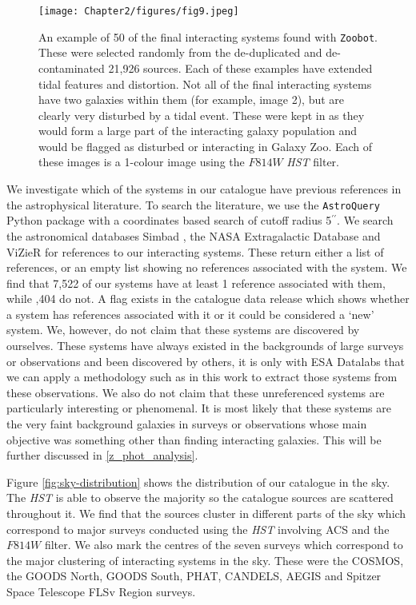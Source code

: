 {\begin{figure}
  \centering
  \texttt{[image: Chapter2/figures/fig9.jpeg]}
  \caption[An example of 50 of the final interacting systems found with \texttt{Zoobot}.]{An example of 50 of the final interacting systems found with \texttt{Zoobot}. These were selected randomly from the de-duplicated and de-contaminated 21,926 sources. Each of these examples have extended tidal features and distortion. Not all of the final interacting systems have two galaxies within them (for example, image 2), but are clearly very disturbed by a tidal event. These were kept in as they would form a large part of the interacting galaxy population and would be flagged as disturbed or interacting in Galaxy Zoo. Each of these images is a 1-colour image using the $F814W$ \emph{HST} filter.}
  \label{fig:interactors}
\end{figure}

We investigate which of the systems in our catalogue have previous references in the astrophysical literature. To search the literature, we use the \texttt{AstroQuery} Python package with a coordinates based search of cutoff radius 5$^{\prime\prime}$. We search the astronomical databases Simbad \citep{simbad}, the NASA Extragalactic Database \citep[NED;][]{1991ASSL..171...89H} and ViZieR \citep{2000A&AS..143...23O} for references to our interacting systems. These return either a list of references, or an empty list showing no references associated with the system. We find that 7,522 of our systems have at least 1 reference associated with them, while \DIFdelbegin {},404 do not. A flag exists in the catalogue data release which shows whether a system has references associated with it or it could be considered a `new' system. We, however, do not claim that these systems are discovered by ourselves. These systems have always existed in the backgrounds of large surveys or observations and been discovered by others, it is only with ESA Datalabs that we can apply a methodology such as in this work to extract those systems from these observations. We also do not claim that these unreferenced systems are particularly interesting or phenomenal. It is most likely that these systems are the very faint background galaxies in surveys or observations whose main objective was something other than finding interacting galaxies. This will be further discussed in \DIFdelbegin {}\DIFdelend \DIFaddbegin {}\DIFaddend \ref{z_phot_analysis}.

Figure \ref{fig:sky-distribution} shows the distribution of our catalogue in the sky. The \emph{HST} is able to observe the majority so the catalogue sources are scattered throughout it. We find that the sources cluster in different parts of the sky which correspond to major surveys conducted using the \emph{HST} involving ACS \DIFdelbegin {}\DIFdelend and the $F814W$ filter. We also mark the centres of the seven surveys which correspond to the major clustering of interacting systems in the sky. These were the COSMOS, the GOODS North, GOODS South, PHAT, CANDELS, AEGIS and Spitzer Space Telescope FLSv Region \citep{2004A&A...424..371M} surveys.

}
